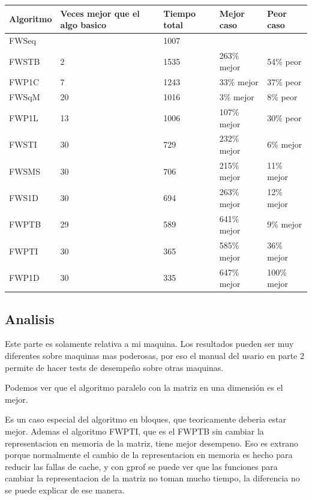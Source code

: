 \documentclass[a4paper,11pt]{article}
\begin{document}
\begin{center}
  \begin{tabular}{p{2cm} | p{4.5cm} | p{2cm} | p{3cm} | p{3cm}}
    \centering \textbf{Algoritmo} & \centering \textbf {Veces mejor que el algo basico} & \centering \textbf{Tiempo total} & \centering \textbf{Mejor caso} & \centering \textbf{Peor caso} \tabularnewline
    \hline
    FWSeq & & 1007 & & \\
    \hline
    \hline
    FWSTB & 2 & 1535 & 263\% mejor & 54\% peor \\
    \hline
    FWP1C & 7 & 1243 & 33\% mejor & 37\% peor \\
    \hline
    FWSqM & 20 & 1016 & 3\% mejor & 8\% peor \\
    \hline
    FWP1L & 13 & 1006 & 107\% mejor & 30\% peor \\
    \hline
    FWSTI & 30 & 729 & 232\% mejor & 6\% mejor \\
    \hline
    FWSMS & 30 & 706 & 215\% mejor & 11\% mejor \\
    \hline
    FWS1D & 30 & 694 & 263\% mejor & 12\% mejor \\
    \hline
    FWPTB & 29 & 589 & 641\% mejor & 9\% mejor \\
    \hline
    FWPTI & 30 & 365 & 585\% mejor & 36\% mejor \\
    \hline
    FWP1D & 30 & 335 & 647\% mejor & 100\% mejor \\
    \hline
  \end{tabular}
\end{center}

\subsection{Analisis}

\indent Este parte es solamente relativa a mi maquina. Los resultados pueden ser muy diferentes sobre maquinas mas poderosas, por eso el manual del usario en parte 2 permite de hacer tests de desempeño sobre otras maquinas.

Podemos ver que el algoritmo paralelo con la matriz en una dimensión es el mejor. 

Es un caso especial del algoritmo en bloques, que teoricamente deberia estar mejor. Ademas el algoritmo FWPTI, que es el FWPTB sin cambiar la representacion en memoria de la matriz, tiene mejor desempeno. Eso es extrano porque normalmente el cambio de la representacion en memoria es hecho para reducir las fallas de cache, y con gprof se puede ver que las funciones para cambiar la representacion de la matriz no toman mucho tiempo, la diferencia no se puede explicar de ese manera.
\end{document}
